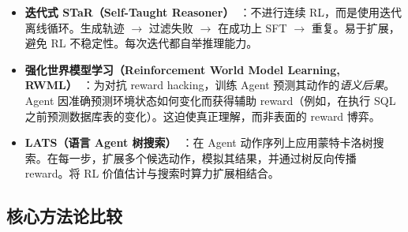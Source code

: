 \begin{itemize}
  \item \textbf{迭代式 STaR（Self-Taught Reasoner）}~\cite{zelikman2022star}：不进行连续 RL，而是使用迭代离线循环。生成轨迹 $\rightarrow$ 过滤失败 $\rightarrow$ 在成功上 SFT $\rightarrow$ 重复。易于扩展，避免 RL 不稳定性。每次迭代都自举推理能力。
  \item \textbf{强化世界模型学习（Reinforcement World Model Learning, RWML）}~\cite{yu2026rwml}：为对抗 reward hacking，训练 Agent 预测其动作的\emph{语义后果}。Agent 因准确预测环境状态如何变化而获得辅助 reward（例如，在执行 SQL 之前预测数据库表的变化）。这迫使真正理解，而非表面的 reward 博弈。
  \item \textbf{LATS（语言 Agent 树搜索）}~\cite{zhou2024lats}：在 Agent 动作序列上应用蒙特卡洛树搜索。在每一步，扩展多个候选动作，模拟其结果，并通过树反向传播 reward。将 RL 价值估计与搜索时算力扩展相结合。
\end{itemize}

\subsection{核心方法论比较}
\label{core-methodology-comparison}

